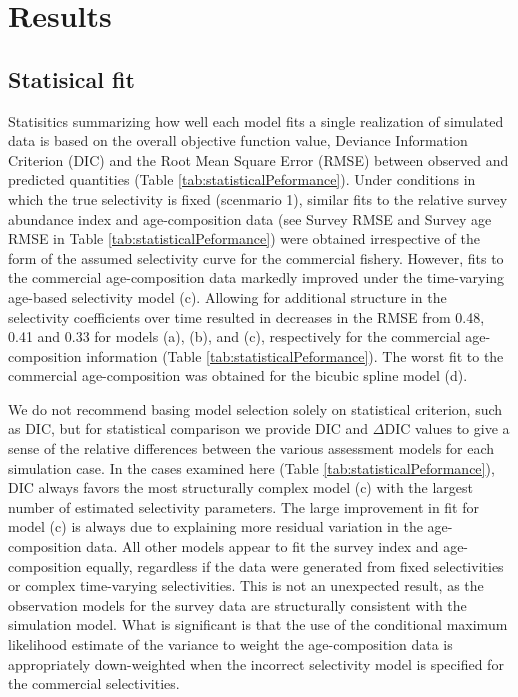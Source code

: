 


\section*{Results} %
\label{sec:results}

\subsection*{Statisical fit} %
\label{sub:statisical_fit}

Statisitics summarizing how well each model fits a single realization of simulated data is based on the overall objective function value, Deviance Information Criterion (DIC) and the Root Mean Square Error (RMSE) between observed and predicted quantities (Table \ref{tab:statisticalPeformance}). Under conditions in which the true selectivity is fixed (scenmario 1), similar fits to the relative survey abundance index and age-composition data (see Survey RMSE and Survey age RMSE in Table \ref{tab:statisticalPeformance}) were obtained  irrespective of the form of the assumed selectivity curve for the commercial fishery.  However, fits to the commercial age-composition data markedly improved under the time-varying age-based selectivity model (c).  Allowing for additional structure in the selectivity coefficients over time resulted in decreases in the RMSE from 0.48, 0.41 and 0.33 for models (a), (b), and (c), respectively for the commercial age-composition information (Table \ref{tab:statisticalPeformance}).  The worst fit to the commercial age-composition was obtained for the bicubic spline model (d).

We do not recommend basing model selection solely on statistical criterion, such as DIC, but for statistical comparison we provide DIC and $\Delta$DIC values to give a sense of the relative differences between the various assessment models for each simulation case.  In the cases examined here (Table \ref{tab:statisticalPeformance}), DIC always favors the most structurally complex model (c) with the largest number of estimated selectivity parameters. The large improvement in fit for model (c) is always due to explaining more residual variation in the age-composition data. All other models appear to fit the survey index and age-composition equally, regardless if the data were generated from fixed selectivities or complex time-varying selectivities.  This is not an unexpected result, as the observation models for the survey data are structurally consistent with the simulation model.  What is significant is that the use of the conditional maximum likelihood estimate of the variance to weight the age-composition data is appropriately down-weighted when the incorrect selectivity model is specified for the commercial selectivities. 




